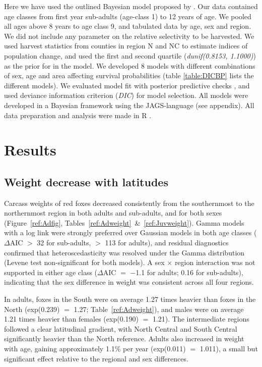 \documentclass[PCJ,Unicode,screen]{cedram}
\begin{document}
Here we have used the outlined Bayesian model proposed by \citet{skellyFlexibleBayesianApproach}. Our data contained age classes from first year sub-adults (age-class 1) to 12 years of age. We pooled all ages above 8 years to age class 9, and tabulated data by age, sex and region. We did not include any parameter on the relative selectivity to be harvested. We used harvest statistics from counties in region N and NC to estimate indices of population change, and used the first and second quartile (\emph{dunif(0.8153, 1.1000)}) as the prior for \lambda in the model. We developed 8 models  with different combinations of sex, age and area affecting survival probabilities (table \ref{table:DICBP} lists the different models). We evaluated model fit with posterior predictive checks \citep{kery2010introduction}, and used deviance information criterion (\emph{DIC}) for model selection. All models were developed in a Bayesian framework using the JAGS-language \citep{plummer2003jags} (see appendix). All data preparation and analysis were made in R \citep{rcoreteamLanguageEnvironmentStatistical2024}.

\section*{Results}

\subsection*{Weight decrease with latitudes}

Carcass weights of red foxes decreased consistently from the southernmost to the northernmost region in both adults and sub-adults, and for both sexes (Figure~\ref{ref:Adfig}, Tables~\ref{ref:Adweight}~\&~\ref{ref:Juvweight}). Gamma models with a log link were strongly preferred over Gaussian models in both age classes ($\Delta$AIC $>$ 32 for sub-adults, $>$ 113 for adults), and residual diagnostics confirmed that heteroscedasticity was resolved under the Gamma distribution (Levene test non-significant for both models). A sex $\times$ region interaction was not supported in either age class ($\Delta$AIC $=$ $-$1.1 for adults; 0.16 for sub-adults), indicating that the sex difference in weight was consistent across all four regions.

In adults, foxes in the South were on average 1.27 times heavier than foxes in the North (exp(0.239) $=$ 1.27; Table~\ref{ref:Adweight}), and males were on average 1.21 times heavier than females (exp(0.190) $=$ 1.21). The intermediate regions followed a clear latitudinal gradient, with North Central and South Central significantly heavier than the North reference. Adults also increased in weight with age, gaining approximately 1.1\% per year (exp(0.011) $=$ 1.011), a small but significant effect relative to the regional and sex differences.
\end{document}
